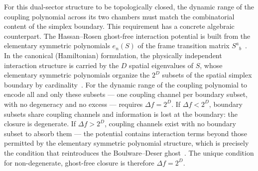 \documentclass[a4paper,11pt]{article}
\begin{document}
For this dual-sector structure to be topologically
closed, the dynamic range of the coupling polynomial
across its two chambers must match the combinatorial
content of the simplex boundary. This requirement has a
concrete algebraic counterpart. The Hassan--Rosen
ghost-free interaction potential is built from the
elementary symmetric polynomials $e_n(S)$ of the frame
transition matrix
$S^a{}_b$~\cite{HR2012a,HR2012b,Alexandrov2013}. In the
canonical (Hamiltonian) formulation, the physically
independent interaction structure is carried by the $D$
spatial eigenvalues of $S$, whose elementary symmetric
polynomials organize the $2^D$ subsets of the spatial
simplex boundary by
cardinality~\cite{Alexandrov2013}. For the dynamic range
of the coupling polynomial to encode all and only these
subsets --- one coupling channel per boundary subset,
with no degeneracy and no excess --- requires
$\Delta f = 2^D$. If $\Delta f < 2^D$, boundary subsets
share coupling channels and information is lost at the
boundary: the closure is degenerate. If
$\Delta f > 2^D$, coupling channels exist with no
boundary subset to absorb them --- the potential
contains interaction terms beyond those permitted by the
elementary symmetric polynomial structure, which is
precisely the condition that reintroduces the
Boulware--Deser ghost~\cite{BD1972,HR2012b}. The unique
condition for non-degenerate, ghost-free closure is
therefore $\Delta f = 2^D$.
\end{document}
